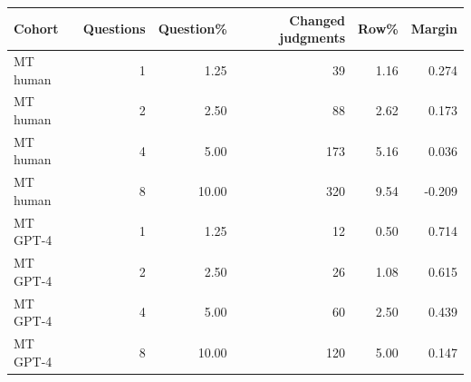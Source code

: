 \begin{tabular}{lrrrrr}
\toprule
Cohort & Questions & Question\% & Changed judgments & Row\% & Margin \\
\midrule
MT human & 1 & 1.25 & 39 & 1.16 & 0.274 \\
MT human & 2 & 2.50 & 88 & 2.62 & 0.173 \\
MT human & 4 & 5.00 & 173 & 5.16 & 0.036 \\
MT human & 8 & 10.00 & 320 & 9.54 & -0.209 \\
MT GPT-4 & 1 & 1.25 & 12 & 0.50 & 0.714 \\
MT GPT-4 & 2 & 2.50 & 26 & 1.08 & 0.615 \\
MT GPT-4 & 4 & 5.00 & 60 & 2.50 & 0.439 \\
MT GPT-4 & 8 & 10.00 & 120 & 5.00 & 0.147 \\
\bottomrule
\end{tabular}
